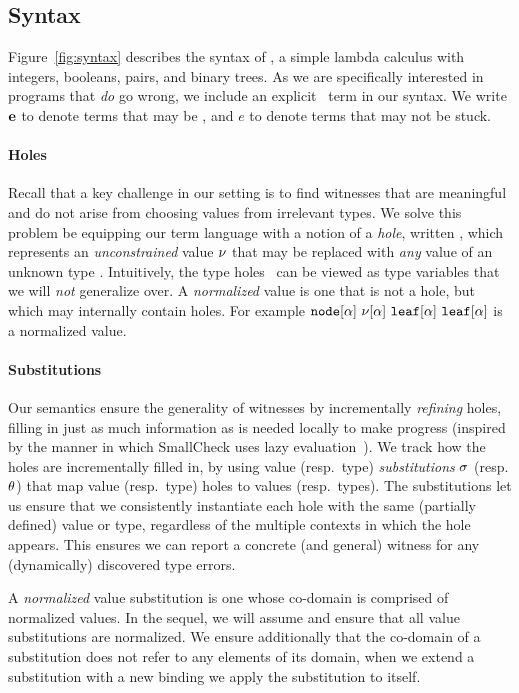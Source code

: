 \subsection{Syntax}
\label{sec:syntax}

%
Figure~\ref{fig:syntax} describes the syntax of \lang, a simple lambda
calculus with integers, booleans, pairs, and binary trees.
%
As we are specifically interested in programs that \emph{do} go wrong,
we include an explicit \stuck\ term in our syntax. We write $\mathbf{e}$ to
denote terms that may be \stuck, and $e$ to denote terms that may not be
stuck.

\paragraph{Holes}
\label{sec:holes}
%
Recall that a key challenge in our setting is to find witnesses
that are meaningful and do not arise from choosing values from
irrelevant types.
%
We solve this problem be equipping our term language with a
notion of a \emph{hole}, written \vhole{\thole}, which represents
an \emph{unconstrained} value $\nu$ that may be replaced with
\emph{any} value of an unknown type \thole.
%
Intuitively, the type holes \thole\ can be viewed as type variables
that we will \emph{not} generalize over.
%
A \emph{normalized} value is one that is not a hole,
but which may internally contain holes.
%
For example
$\mathtt{node}[\alpha]\ \nu[\alpha]\ \mathtt{leaf}[\alpha]\ \mathtt{leaf}[\alpha]$ is a
normalized value.

\paragraph{Substitutions}
%
Our semantics ensure the generality of witnesses by incrementally
\emph{refining} holes, filling in just as much information as is
needed locally to make progress (inspired by the manner in
which SmallCheck uses lazy evaluation~\cite{runciman_smallcheck_2008}).
%
We track how the holes are incrementally filled in, by using
value (resp.\ type) \emph{substitutions} $\sigma$ (resp. $\theta$)
that map value (resp.\ type) holes to values (resp.\ types).
%
The substitutions let us ensure that we consistently instantiate each
hole with the same (partially defined) value or type, regardless of the
multiple contexts in which the hole appears.
%
This ensures we can report a concrete (and general) witness for any
(dynamically) discovered type errors.

A \emph{normalized} value substitution is one whose co-domain is
comprised of normalized values.
%
In the sequel, we will assume and ensure that all value substitutions
are normalized.
%
We ensure additionally that the co-domain of a substitution does not
refer to any elements of its domain, \ie when we extend a substitution
with a new binding we apply the substitution to itself.

